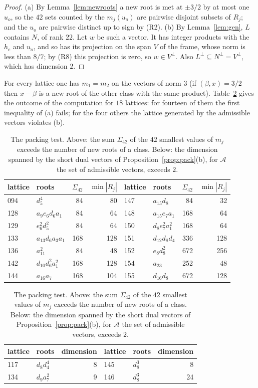 \documentclass[11pt]{amsart}
\theoremstyle{definition}
\theoremstyle{remark}
\begin{document}
\begin{proof}
(a) By Lemma~\ref{lem:newroots} a new root is met at $\pm3/2$ by at most one $u_o$, so the $42$ sets counted by the
$m_j(u_o)$ are pairwise disjoint subsets of $R_j$; and the $u_o$ are pairwise distinct up to sign by (R2). (b) By
Lemma~\ref{lem:gen}, $L$ contains $N$, of rank $22$. Let $w$ be such a vector. It has integer products with the $h_c$ and
$u_o$, and so has its projection on the span $V$ of the frame, whose norm is less than $8/7$; by (R8) this projection is
zero, so $w\in V^\perp$. Also $L^\perp\subseteq N^\perp=V^\perp$, which has dimension $2$.
\end{proof}

For every lattice one has $m_1=m_2$ on the vectors of norm $3$ (if $(\beta,x)=3/2$ then $x-\beta$ is a new root of the other
class with the same product). Table~\ref{tab:pack} gives the outcome of the computation for $18$ lattices: for fourteen of
them the first inequality of (a) fails; for the four others the lattice generated by the admissible vectors violates (b).

\begin{table}[ht]
\centering\small
\begin{tabular}{llrr@{\qquad\quad}llrr}
\toprule
lattice & roots & $\Sigma_{42}$ & $\min|R_j|$ & lattice & roots & $\Sigma_{42}$ & $\min|R_j|$\\
\midrule
094 & $d_5^4$ & 84 & 80 & 147 & $a_{15}d_8$ & 84 & 32\\
128 & $a_9e_6d_6a_1$ & 84 & 64 & 148 & $a_{15}e_7a_1$ & 168 & 64\\
129 & $e_6^2d_5^2$ & 84 & 64 & 150 & $d_8e_7^2a_1^2$ & 168 & 64\\
133 & $a_{13}d_6a_3a_1$ & 168 & 128 & 151 & $d_{12}d_8d_4$ & 336 & 128\\
136 & $a_{11}^2$ & 84 & 48 & 152 & $e_8d_8^2$ & 672 & 256\\
142 & $d_{10}d_6^2a_1^2$ & 168 & 128 & 154 & $a_{23}$ & 252 & 48\\
144 & $a_{16}a_7$ & 168 & 104 & 155 & $d_{16}d_8$ & 672 & 128\\
\bottomrule
\end{tabular}

\medskip
\begin{tabular}{llr@{\qquad\quad}llr}
\toprule
lattice & roots & dimension & lattice & roots & dimension\\
\midrule
117 & $d_8d_4^4$ & 8 & 145 & $d_8^3$ & 8\\
134 & $d_9a_7^2$ & 9 & 146 & $d_8^3$ & 24\\
\bottomrule
\end{tabular}
\caption{The packing test. Above: the sum $\Sigma_{42}$ of the $42$ smallest values of $m_j$ exceeds the number of new roots
of a class. Below: the dimension spanned by the short dual vectors of Proposition~\ref{prop:pack}(b), for $\mathcal A$ the
set of admissible vectors, exceeds $2$.}\label{tab:pack}
\end{table}
\end{document}
